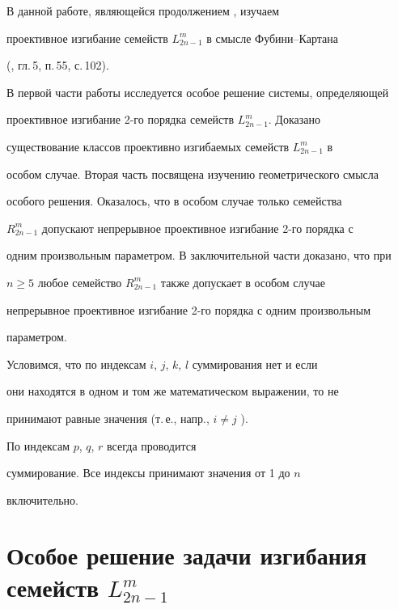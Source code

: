 \label{begin} 


 


 


В данной работе, являющейся продолжением \cite{1}, изучаем


проективное изгибание семейств $L^m_{2n-1}$ в смысле Фубини--Картана 


(\cite{2}, гл.\,5, п.\,55, с.\,102). 


 


В первой части работы исследуется особое решение системы, определяющей 


проективное изгибание 2-го порядка семейств $L^m_{2n-1}$. Доказано 


существование классов проективно изгибаемых семейств $L^m_{2n-1}$ в 


особом случае. Вторая часть посвящена изучению геометрического смысла 


особого решения. Оказалось, что в особом случае только семейства 


$R^m_{2n-1}$ допускают непрерывное проективное изгибание 2-го порядка с 


одним произвольным параметром. В заключительной части доказано, что при 


$n\ge5$ любое семейство $R^m_{2n-1}$ также допускает в особом случае 


непрерывное проективное изгибание 2-го порядка с одним произвольным


параметром.


 


Условимся, что по индексам $i$, $j$, $k$, $l$ суммирования нет и если 


они находятся в одном и том же математическом выражении, то не 


принимают равные значения (т.\,е., напр., $i\ne j$ ).


По индексам $p$, $q$, $r$ всегда проводится 


суммирование. Все индексы принимают значения от 1 до $n$ 


включительно. 


 


\section{Особое решение задачи изгибания семейств $L^m_{2n-1}$} 


